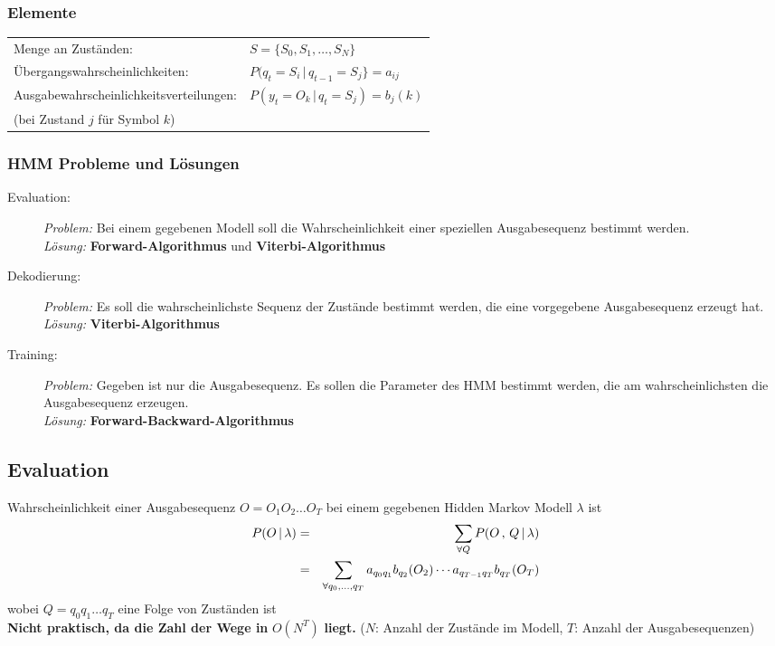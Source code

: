 \subsubsection*{Elemente}

\begin{center}
\begin{tabular}{ll}
Menge an Zuständen: & $S = \{S_0, S_1, \dots, S_N\}$ \\
Übergangswahrscheinlichkeiten: & $P(q_t = S_i \, | \, q_{t-1} = S_j \} = a_{ij}$ \\
Ausgabewahrscheinlichkeitsverteilungen: & $P(y_t = O_k \, | \, q_t = S_j) = b_j(k)$ \\
(bei Zustand $j$ für Symbol $k$)
\end{tabular}
\end{center}

\subsubsection*{HMM Probleme und Lösungen}

\begin{description}
\item[Evaluation:] \textsl{Problem:} Bei einem gegebenen Modell soll die Wahrscheinlichkeit einer speziellen Ausgabesequenz bestimmt werden. \\ \textsl{Lösung:} \textbf{Forward-Algorithmus} und \textbf{Viterbi-Algorithmus}
\item[Dekodierung:] \textsl{Problem:} Es soll die wahrscheinlichste Sequenz der Zustände bestimmt werden, die eine vorgegebene Ausgabesequenz erzeugt hat. \\ \textsl{Lösung:} \textbf{Viterbi-Algorithmus}
\item[Training:] \textsl{Problem:} Gegeben ist nur die Ausgabesequenz. Es sollen die Parameter des HMM bestimmt werden, die am wahrscheinlichsten die Ausgabesequenz erzeugen. \\ \textsl{Lösung:} \textbf{Forward-Backward-Algorithmus}
\end{description}

\subsection{Evaluation}

Wahrscheinlichkeit einer Ausgabesequenz $O = O_1O_2 \dots O_T$ bei einem gegebenen Hidden Markov Modell $\lambda$ ist
\begin{eqnarray*}
P(O \, | \, \lambda) &=& \sum\limits_{\forall Q} P(O \, , \, Q \, | \, \lambda) \\ &=& \sum\limits_{\forall q_0, \dots, q_T} a_{q_0q_1} b_{q_2}(O_2) \cdots a_{q_{T-1}q_T}b_{q_T}(O_T)
\end{eqnarray*}
wobei $Q = q_0q_1\dots q_T$ eine Folge von Zuständen ist \\
\textbf{Nicht praktisch, da die Zahl der Wege in} $O(N^T)$ \textbf{liegt.} ($N$: Anzahl der Zustände im Modell, $T$: Anzahl der Ausgabesequenzen)

